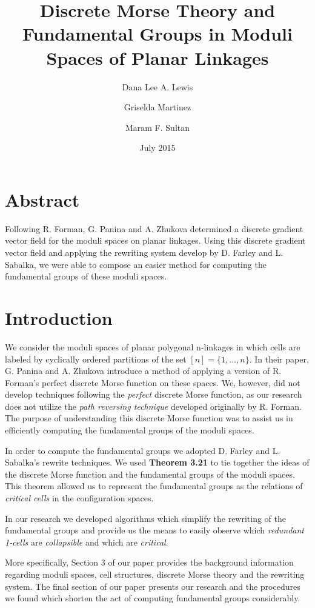 \documentclass{amsart}
\title{Discrete Morse Theory and Fundamental Groups in Moduli Spaces of Planar Linkages}
\author{Dana Lee A. Lewis}
\author{Griselda Martinez}
\author{Maram F. Sultan}
\date{July 2015}
\begin{document}
\maketitle
\section{Abstract}

Following R. Forman\cite{RFOR}, G. Panina and A. Zhukova\cite{PANZU} determined a discrete gradient vector field for the moduli spaces on planar linkages. Using this discrete gradient vector field and applying the rewriting system develop by  D. Farley and L. Sabalka\cite{FS1}, we were able to compose an easier method for computing the fundamental groups of these moduli spaces.

\section{Introduction}
We consider the moduli spaces of planar polygonal n-linkages in which cells are labeled by cyclically ordered partitions of the set $[n]=\{1,\ldots,n\}$\cite{PANZU}. In their paper, G. Panina and A. Zhukova introduce a method of applying a version of R. Forman's perfect discrete Morse function on these spaces. We, however, did not develop techniques following the \emph{perfect} discrete Morse function, as our research does not utilize the \emph{path reversing technique} developed originally by R. Forman. The purpose of understanding this discrete Morse function was to assist us in efficiently computing the fundamental groups of the moduli spaces.

In order to compute the fundamental groups we adopted D. Farley and L. Sabalka's rewrite techniques. We used \textbf{Theorem 3.21} to tie together the ideas of the discrete Morse function and the fundamental groups of the moduli spaces. This theorem allowed us to represent the fundamental groups as the relations of \emph{critical cells} in the configuration spaces.

In our research we developed algorithms which simplify the rewriting of the fundamental groups and provide us the means to easily observe which \emph{redundant 1-cells} are \emph{collapsible} and which are \emph{critical}.

More specifically, Section 3 of our paper provides the background information regarding moduli spaces, cell structures, discrete Morse theory and the rewriting system. The final section of our paper presents our research and the procedures we found which shorten the act of computing fundamental groups considerably.
\end{document}

